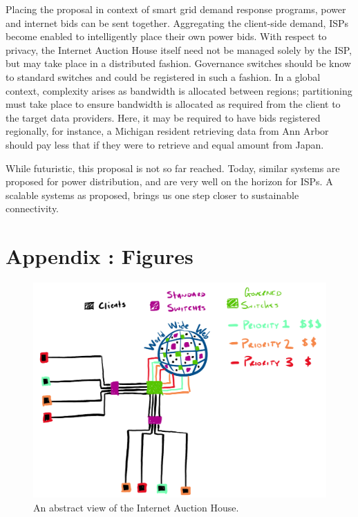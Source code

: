 \documentclass{article}
\begin{document}
Placing the proposal in context of smart grid demand response programs, power and internet bids can be sent together. 
Aggregating the client-side demand, ISPs become enabled to intelligently place their own power bids. 
With respect to privacy, the Internet Auction House itself need not be managed solely by the ISP, but may take place in a distributed fashion. 
Governance switches should be know to standard switches and could be registered in such a fashion. 
In a global context, complexity arises as bandwidth is allocated between regions; partitioning must take place to ensure bandwidth is allocated as required from the client to the target data providers.
Here, it may be required to have bids registered regionally, for instance, a Michigan resident retrieving data from Ann Arbor should pay less that if they were to retrieve and equal amount from Japan. 

While futuristic, this proposal is not so far reached. 
Today, similar systems are proposed for power distribution, and are very well on the horizon for ISPs.
A scalable systems as proposed, brings us one step closer to sustainable connectivity. 

\newpage

\section{Appendix : Figures}

\begin{figure}[ht!]
    \centering
    \includegraphics[width=\textwidth]{./Governance.PNG}
    \caption{An abstract view of the Internet Auction House.}
    \label{fig:IAH}
\end{figure}



\newpage

{}
\end{document}
